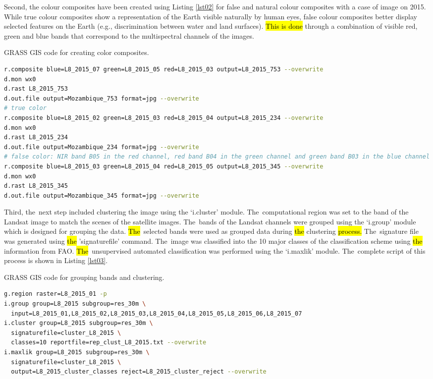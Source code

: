 \documentclass[coasts,article,accept,pdftex,oneauthor]{Definitions/mdpi}
\begin{document}
Second, {the }colour composites have been created using Listing \ref{lst02} for false and natural colour composites with a case of image on 2015. {While true colour composites show a representation of the Earth visible naturally by human eyes, false colour composites better display selected features on the Earth (e.g., discrimination between water and land surfaces). \hl{This is done }through a combination of visible red, green and blue bands that correspond to the multispectral channels of the images}.

\vspace{-6pt}
\begin{listing}[H]
\caption{GRASS GIS code for creating color composites.}
\begin{lstlisting}[language=bash,caption={},style=mystyle,label={lst02}]
r.composite blue=L8_2015_07 green=L8_2015_05 red=L8_2015_03 output=L8_2015_753 --overwrite
d.mon wx0
d.rast L8_2015_753
d.out.file output=Mozambique_753 format=jpg --overwrite
# true color
r.composite blue=L8_2015_02 green=L8_2015_03 red=L8_2015_04 output=L8_2015_234 --overwrite
d.mon wx0
d.rast L8_2015_234
d.out.file output=Mozambique_234 format=jpg --overwrite
# false color: NIR band B05 in the red channel, red band B04 in the green channel and green band B03 in the blue channel
r.composite blue=L8_2015_03 green=L8_2015_04 red=L8_2015_05 output=L8_2015_345 --overwrite
d.mon wx0
d.rast L8_2015_345
d.out.file output=Mozambique_345 format=jpg --overwrite
\end{lstlisting}
\end{listing}\vspace{-9pt}

Third, the~next step included clustering the image using the `i.cluster' module. The~computational region was set to the band of the Landsat image to match the scenes {of the satellite images}. The~bands of {the }Landsat channels were grouped using {the} `i.group' module {which is designed }for grouping the data{. \hl{The}~selected bands} were used as grouped data during \hl{the }clustering \hl{process. }The~signature file was generated using \hl{the }'signaturefile' command. The~image was classified into {the }10 major classes of the classification scheme using \hl{the} information from FAO. \hl{The}~unsupervised automated classification was performed using the `i.maxlik' module. The~complete script {of this process }is shown in Listing \ref{lst03}. 
 
\begin{listing}[H]
\caption{GRASS GIS code for grouping bands and clustering.} 
\begin{lstlisting}[language=bash,caption={},style=mystyle,label={lst03}]
g.region raster=L8_2015_01 -p
i.group group=L8_2015 subgroup=res_30m \
  input=L8_2015_01,L8_2015_02,L8_2015_03,L8_2015_04,L8_2015_05,L8_2015_06,L8_2015_07
i.cluster group=L8_2015 subgroup=res_30m \
  signaturefile=cluster_L8_2015 \
  classes=10 reportfile=rep_clust_L8_2015.txt --overwrite
i.maxlik group=L8_2015 subgroup=res_30m \
  signaturefile=cluster_L8_2015 \
  output=L8_2015_cluster_classes reject=L8_2015_cluster_reject --overwrite
\end{lstlisting}
\end{listing}\vspace{-9pt}
\end{document}

